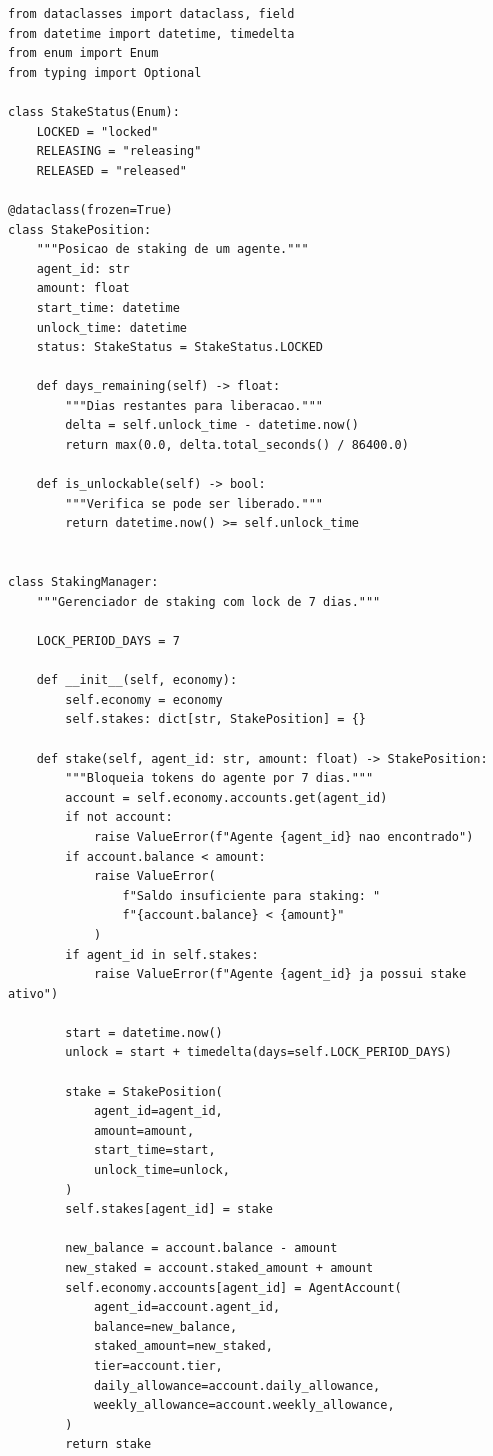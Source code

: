 \begin{lstlisting}[caption={Sistema de staking (SPEC-023)},label={lst:staking}]
from dataclasses import dataclass, field
from datetime import datetime, timedelta
from enum import Enum
from typing import Optional

class StakeStatus(Enum):
    LOCKED = "locked"
    RELEASING = "releasing"
    RELEASED = "released"

@dataclass(frozen=True)
class StakePosition:
    """Posicao de staking de um agente."""
    agent_id: str
    amount: float
    start_time: datetime
    unlock_time: datetime
    status: StakeStatus = StakeStatus.LOCKED

    def days_remaining(self) -> float:
        """Dias restantes para liberacao."""
        delta = self.unlock_time - datetime.now()
        return max(0.0, delta.total_seconds() / 86400.0)

    def is_unlockable(self) -> bool:
        """Verifica se pode ser liberado."""
        return datetime.now() >= self.unlock_time


class StakingManager:
    """Gerenciador de staking com lock de 7 dias."""

    LOCK_PERIOD_DAYS = 7

    def __init__(self, economy):
        self.economy = economy
        self.stakes: dict[str, StakePosition] = {}

    def stake(self, agent_id: str, amount: float) -> StakePosition:
        """Bloqueia tokens do agente por 7 dias."""
        account = self.economy.accounts.get(agent_id)
        if not account:
            raise ValueError(f"Agente {agent_id} nao encontrado")
        if account.balance < amount:
            raise ValueError(
                f"Saldo insuficiente para staking: "
                f"{account.balance} < {amount}"
            )
        if agent_id in self.stakes:
            raise ValueError(f"Agente {agent_id} ja possui stake ativo")

        start = datetime.now()
        unlock = start + timedelta(days=self.LOCK_PERIOD_DAYS)

        stake = StakePosition(
            agent_id=agent_id,
            amount=amount,
            start_time=start,
            unlock_time=unlock,
        )
        self.stakes[agent_id] = stake

        new_balance = account.balance - amount
        new_staked = account.staked_amount + amount
        self.economy.accounts[agent_id] = AgentAccount(
            agent_id=account.agent_id,
            balance=new_balance,
            staked_amount=new_staked,
            tier=account.tier,
            daily_allowance=account.daily_allowance,
            weekly_allowance=account.weekly_allowance,
        )
        return stake


\end{lstlisting}
